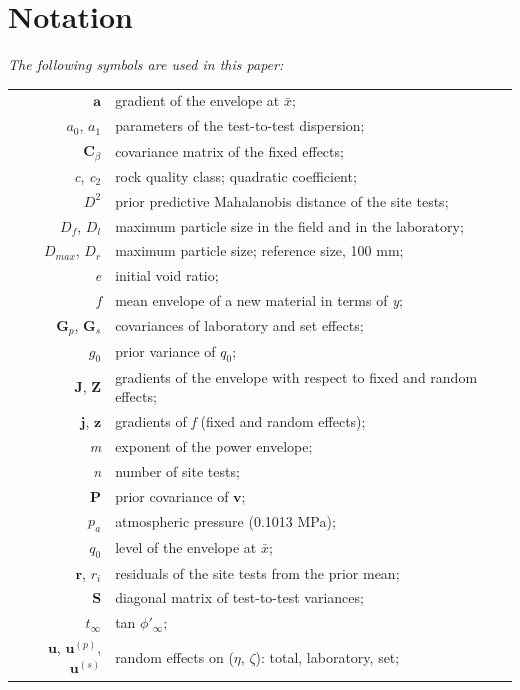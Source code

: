 \documentclass[Journal,letterpaper]{ascelike-new}
\begin{document}
\section{Notation}
\noindent \textit{The following symbols are used in this paper:}

\begin{longtable}{@{}r@{\hspace{1em}=\hspace{1em}}p{5.0in}@{}}
$\mathbf{a}$ & gradient of the envelope at $\bar{x}$; \\
$a_0$, $a_1$ & parameters of the test-to-test dispersion; \\
$\mathbf{C}_\beta$ & covariance matrix of the fixed effects; \\
\textit{c}, \textit{c}$_{2}$ & rock quality class; quadratic coefficient; \\
$D^2$ & prior predictive Mahalanobis distance of the site tests; \\
$D_f$, $D_l$ & maximum particle size in the field and in the laboratory; \\
$D_{max}$, $D_r$ & maximum particle size; reference size, 100 mm; \\
\textit{e} & initial void ratio; \\
\textit{f} & mean envelope of a new material in terms of \textit{y}; \\
$\mathbf{G}_p$, $\mathbf{G}_s$ & covariances of laboratory and set effects; \\
$g_0$ & prior variance of $q_0$; \\
$\mathbf{J}$, $\mathbf{Z}$ & gradients of the envelope with respect to fixed and random effects; \\
$\mathbf{j}$, $\mathbf{z}$ & gradients of \textit{f} (fixed and random effects); \\
\textit{m} & exponent of the power envelope; \\
\textit{n} & number of site tests; \\
$\mathbf{P}$ & prior covariance of $\mathbf{v}$; \\
$p_a$ & atmospheric pressure (0.1013 MPa); \\
$q_0$ & level of the envelope at $\bar{x}$; \\
$\mathbf{r}$, $r_i$ & residuals of the site tests from the prior mean; \\
$\mathbf{S}$ & diagonal matrix of test-to-test variances; \\
$t_\infty$ & tan $\phi'_\infty$; \\
$\mathbf{u}$, $\mathbf{u}^{(p)}$, $\mathbf{u}^{(s)}$ & random effects on ($\eta$, $\zeta$): total, laboratory, set; \\

\end{longtable}
\end{document}
